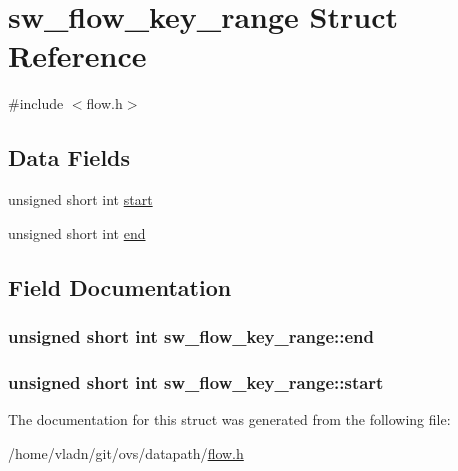 \hypertarget{structsw__flow__key__range}{}\section{sw\+\_\+flow\+\_\+key\+\_\+range Struct Reference}
\label{structsw__flow__key__range}


{\ttfamily \#include $<$flow.\+h$>$}

\subsection*{Data Fields}
\begin{DoxyCompactItemize}
\item 
unsigned short int \hyperlink{structsw__flow__key__range_a3139158cea80b4e5af36967f3748e846}{start}
\item 
unsigned short int \hyperlink{structsw__flow__key__range_ab9c9d06e6ed2b9600d295dfdd94cc05a}{end}
\end{DoxyCompactItemize}


\subsection{Field Documentation}
\hypertarget{structsw__flow__key__range_ab9c9d06e6ed2b9600d295dfdd94cc05a}{}
\subsubsection[{end}]{\setlength{\rightskip}{0pt plus 5cm}unsigned short int sw\+\_\+flow\+\_\+key\+\_\+range\+::end}\label{structsw__flow__key__range_ab9c9d06e6ed2b9600d295dfdd94cc05a}
\hypertarget{structsw__flow__key__range_a3139158cea80b4e5af36967f3748e846}{}
\subsubsection[{start}]{\setlength{\rightskip}{0pt plus 5cm}unsigned short int sw\+\_\+flow\+\_\+key\+\_\+range\+::start}\label{structsw__flow__key__range_a3139158cea80b4e5af36967f3748e846}


The documentation for this struct was generated from the following file\+:\begin{DoxyCompactItemize}
\item 
/home/vladn/git/ovs/datapath/\hyperlink{flow_8h}{flow.\+h}\end{DoxyCompactItemize}
